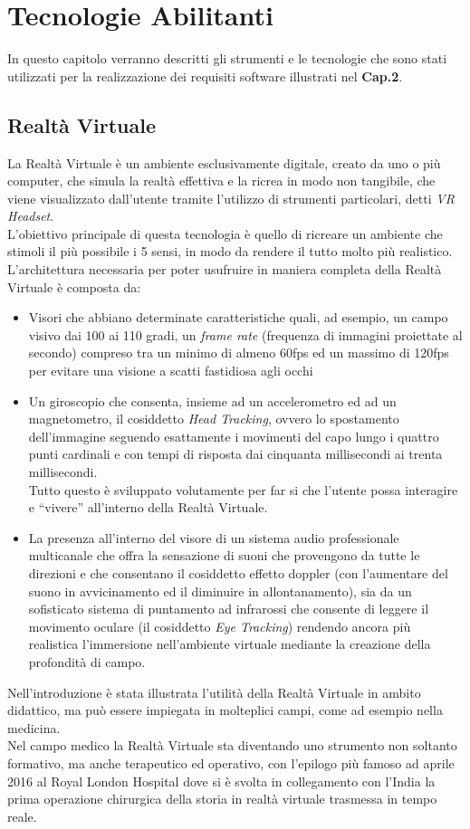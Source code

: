 \chapter{Tecnologie Abilitanti}
In questo capitolo verranno descritti gli strumenti e le tecnologie che sono stati utilizzati per la realizzazione dei requisiti software illustrati nel \textbf{Cap.2}.
\section{Realtà Virtuale}
La Realtà Virtuale\cite{VRRe} è un ambiente esclusivamente digitale, creato da uno o più computer, che simula la realtà effettiva e la ricrea in modo non tangibile, che viene visualizzato dall'utente tramite l'utilizzo di strumenti particolari, detti \textit{VR Headset}.
\\L'obiettivo principale di questa tecnologia è quello di ricreare un ambiente che stimoli il più possibile i 5 sensi, in modo da rendere il tutto molto più realistico.
\\L'architettura necessaria per poter usufruire in maniera completa della Realtà Virtuale è composta da:
\begin{itemize}
    \item Visori che abbiano determinate caratteristiche quali, ad esempio, un campo visivo dai 100 ai 110 gradi, un \textit{frame rate} (frequenza di immagini proiettate al secondo) compreso tra un minimo di almeno 60fps ed un massimo di 120fps per evitare una visione a scatti fastidiosa agli occhi
    \item Un giroscopio che consenta, insieme ad un accelerometro ed ad un magnetometro, il cosiddetto \textit{Head Tracking}, ovvero lo spostamento dell'immagine seguendo esattamente i movimenti del capo lungo i quattro punti cardinali e con tempi di risposta dai cinquanta millisecondi ai trenta millisecondi. 
    \\Tutto questo è sviluppato volutamente per far si che l'utente possa interagire e “vivere” all'interno della Realtà Virtuale. 
    \item La presenza all'interno del visore di un sistema audio professionale multicanale che offra la sensazione di suoni che provengono da tutte le direzioni e che consentano il cosiddetto effetto doppler (con l'aumentare del suono in avvicinamento ed il diminuire in allontanamento), sia da un sofisticato sistema di puntamento ad infrarossi che consente di leggere il movimento oculare (il cosiddetto \textit{Eye Tracking}) rendendo ancora più realistica l'immersione nell'ambiente virtuale mediante la creazione della profondità di campo.
\end{itemize} 
Nell'introduzione è stata illustrata l'utilità della Realtà Virtuale in ambito didattico, ma può essere impiegata in molteplici campi, come ad esempio nella medicina.
\\Nel campo medico la Realtà Virtuale sta diventando uno strumento non soltanto formativo, ma anche terapeutico ed operativo, con l'epilogo più famoso ad aprile 2016 al Royal London Hospital dove si è svolta in collegamento con l'India la prima operazione chirurgica della storia in realtà virtuale trasmessa in tempo reale.
